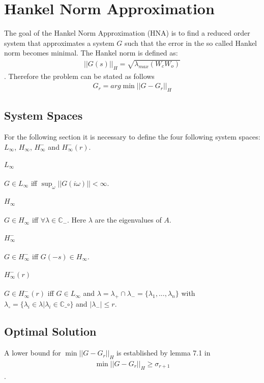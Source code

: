 \section{Hankel Norm Approximation}
The goal of the Hankel Norm Approximation (HNA) is to find a reduced order system that approximates a system \(G\) such that the error in the so called Hankel norm becomes minimal.
The Hankel norm is defined as:
\begin{gather}
||G(s)||_H = \sqrt{\lambda_{max}(W_cW_o)}
\end{gather}
\cite{singh}.
Therefore the problem can be stated as follows
\begin{gather}
G_r = arg\min ||G - G_r||_H \label{hna-prob}
\end{gather}
\subsection{System Spaces}
For the following section it is necessary to define the four following system spaces: \(L_{\infty}\), \(H_{\infty}\), \(H_{\infty}^-\) and \(H_{\infty}^-(r)\).
\paragraph{\(L_{\infty}\)}
\(G \in L_{\infty}\) iff  \(\sup_{\omega}||G(i\omega)|| < \infty\).
\paragraph{\(H_{\infty}\)}
\(G \in H_{\infty}\) iff  \(\forall \lambda \in \mathbb{C}_{-}\).
Here \(\lambda\) are the eigenvalues of \(A\).
\paragraph{\(H_{\infty}^-\)}
\(G \in H_{\infty}^-\) iff \(G(-s) \in H_{\infty}\).
\paragraph{\(H_{\infty}^-(r)\)}
\(G \in H_{\infty}^-(r)\) iff \(G \in L_{\infty}\) and 
\(\lambda = \lambda_+ \cap \lambda_- = \{\lambda_1, ..., \lambda_n \}\) with \(\lambda_{\circ} = \{\lambda_i \in \lambda | \lambda_i \in \mathbb{C}\_{\circ}\}\) and \(|\lambda_-| \leq r\).


\subsection{Optimal Solution}
A lower bound for \(\min ||G - G_r||_H\) is established by lemma 7.1 in \cite{glover84}
\begin{gather}
\min ||G - G_r||_H \geq \sigma_{r+1}
\end{gather}.

